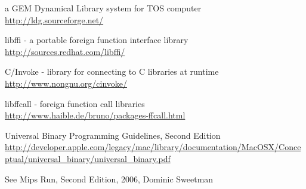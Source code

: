 \begin{thebibliography}{14}
	a GEM Dynamical Library system for TOS computer\\
	\url{http://ldg.sourceforge.net/}

	libffi - a portable foreign function interface library\\
	\url{http://sources.redhat.com/libffi/}

	C/Invoke - library for connecting to C libraries at runtime\\
	\url{http://www.nongnu.org/cinvoke/}

	libffcall - foreign function call libraries\\
	\url{http://www.haible.de/bruno/packages-ffcall.html}

	Universal Binary Programming Guidelines, Second Edition\\
	\url{http://developer.apple.com/legacy/mac/library/documentation/MacOSX/Conceptual/universal\_binary/universal\_binary.pdf}

	See Mips Run, Second Edition, 2006, Dominic Sweetman

\end{thebibliography}

